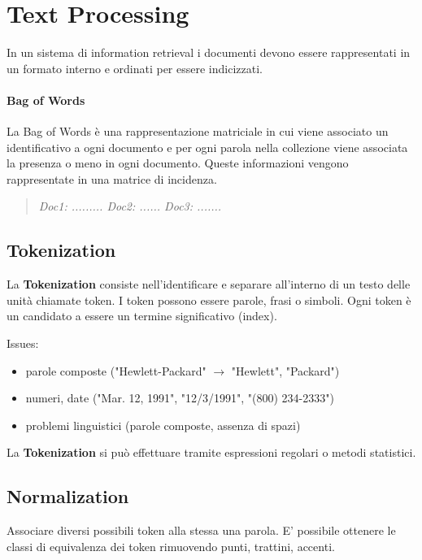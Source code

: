 \chapter{Text Processing}
In un sistema di information retrieval i documenti devono essere rappresentati in un formato interno e ordinati per essere indicizzati.

\subsubsection*{Bag of Words}
La Bag of Words è una rappresentazione matriciale in cui viene associato un identificativo a ogni documento e
per ogni parola nella collezione viene associata la presenza o meno in ogni documento.
Queste informazioni vengono rappresentate in una matrice di incidenza.

\begin{quote}
  \textit{%
    Doc1: .........
    Doc2: ......
    Doc3: .......
  }
\end{quote}


\section{Tokenization}
La \textbf{Tokenization} consiste nell'identificare e separare all'interno di un testo delle unità chiamate token.
I token possono essere parole, frasi o simboli. Ogni token è un candidato a essere un termine significativo (index).


Issues:
\begin{itemize}
  \item parole composte ("Hewlett-Packard" $\rightarrow$ "Hewlett", "Packard")
  \item numeri, date ("Mar. 12, 1991", "12/3/1991", "(800) 234-2333")
  \item problemi linguistici (parole composte, assenza di spazi)
\end{itemize}

La \textbf{Tokenization} si può effettuare tramite espressioni regolari o metodi statistici.

\section{Normalization}
Associare diversi possibili token alla stessa una parola.
E' possibile ottenere le classi di equivalenza dei token rimuovendo punti, trattini, accenti.

